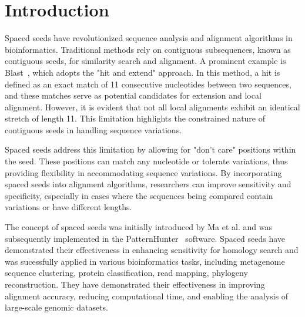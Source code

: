 \documentclass{PHlab-thesis}
\begin{document}


\renewcommand\nomgroup[1]{%
  \item[\bfseries
  \ifstrequal{#1}{A}{General}{%
  \ifstrequal{#1}{B}{Metrics}{%
  \ifstrequal{#1}{C}{Variants}{%
  \ifstrequal{#1}{Z}{Gene/Protein Names}%
  }}}]}


\printnomenclature[5cm]

\newpage
\setcounter{page}{1}


\chapter{Introduction}
Spaced seeds have revolutionized sequence analysis and alignment algorithms in bioinformatics. Traditional methods rely on contiguous subsequences, known as contiguous seeds, for similarity search and alignment. A prominent example is Blast~\cite{ALTSCHUL1990Blast}, which adopts the "hit and extend" approach. In this method, a hit is defined as an exact match of 11 consecutive nucleotides between two sequences, and these matches serve as potential candidates for extension and local alignment. However, it is evident that not all local alignments exhibit an identical stretch of length 11. This limitation highlights the constrained nature of contiguous seeds in handling sequence variations.

Spaced seeds address this limitation by allowing for "don't care" positions within the seed. These positions can match any nucleotide or tolerate variations, thus providing flexibility in accommodating sequence variations. By incorporating spaced seeds into alignment algorithms, researchers can improve sensitivity and specificity, especially in cases where the sequences being compared contain variations or have different lengths.

The concept of spaced seeds was initially introduced by Ma et al. and was subsequently implemented in the PatternHunter~\cite{MaB2002PatternHunter} software. Spaced seeds have demonstrated their effectiveness in enhancing sensitivity for homology search and was sucessfully applied in various bioinformatics tasks, including metagenome sequence clustering, protein classification, read mapping, phylogeny reconstruction. They have demonstrated their effectiveness in improving alignment accuracy, reducing computational time, and enabling the analysis of large-scale genomic datasets.
\end{document}
